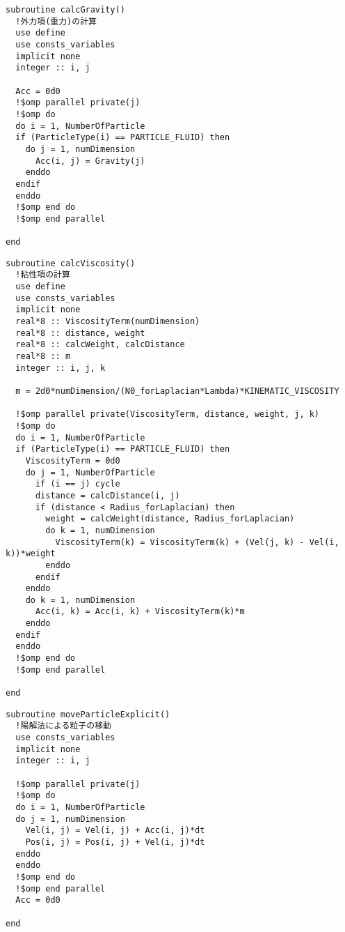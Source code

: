 \begin{lstlisting}[caption=外力項計算ルーチン]
subroutine calcGravity()
  !外力項(重力)の計算
  use define
  use consts_variables
  implicit none
  integer :: i, j

  Acc = 0d0
  !$omp parallel private(j)
  !$omp do
  do i = 1, NumberOfParticle
  if (ParticleType(i) == PARTICLE_FLUID) then
    do j = 1, numDimension
      Acc(i, j) = Gravity(j)
    enddo
  endif
  enddo
  !$omp end do
  !$omp end parallel

end
\end{lstlisting}
\begin{lstlisting}[caption=粘性項計算ルーチン]
subroutine calcViscosity()
  !粘性項の計算
  use define
  use consts_variables
  implicit none
  real*8 :: ViscosityTerm(numDimension)
  real*8 :: distance, weight
  real*8 :: calcWeight, calcDistance
  real*8 :: m
  integer :: i, j, k

  m = 2d0*numDimension/(N0_forLaplacian*Lambda)*KINEMATIC_VISCOSITY

  !$omp parallel private(ViscosityTerm, distance, weight, j, k)
  !$omp do
  do i = 1, NumberOfParticle
  if (ParticleType(i) == PARTICLE_FLUID) then
    ViscosityTerm = 0d0
    do j = 1, NumberOfParticle
      if (i == j) cycle
      distance = calcDistance(i, j)
      if (distance < Radius_forLaplacian) then
        weight = calcWeight(distance, Radius_forLaplacian)
        do k = 1, numDimension
          ViscosityTerm(k) = ViscosityTerm(k) + (Vel(j, k) - Vel(i, k))*weight
        enddo
      endif
    enddo
    do k = 1, numDimension
      Acc(i, k) = Acc(i, k) + ViscosityTerm(k)*m
    enddo
  endif
  enddo
  !$omp end do
  !$omp end parallel

end
\end{lstlisting}
\begin{lstlisting}[caption=仮速度・仮位置計算ルーチン]
subroutine moveParticleExplicit()
  !陽解法による粒子の移動
  use consts_variables
  implicit none
  integer :: i, j

  !$omp parallel private(j)
  !$omp do
  do i = 1, NumberOfParticle
  do j = 1, numDimension
    Vel(i, j) = Vel(i, j) + Acc(i, j)*dt
    Pos(i, j) = Pos(i, j) + Vel(i, j)*dt
  enddo
  enddo
  !$omp end do
  !$omp end parallel
  Acc = 0d0

end
\end{lstlisting}
